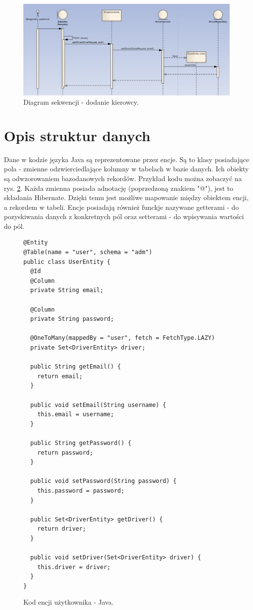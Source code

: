 \begin{figure}
	\centering
	\includegraphics[width=1\textwidth]{./graf/sequence_diagram.png}
	\caption{Diagram sekwencji - dodanie kierowcy.}
	\label{sequence_diagram}
\end{figure}

\section{Opis struktur danych}
\paragraph{}
Dane w kodzie języka Java są reprezentowane przez encje. Są to klasy posiadające pola - zmienne odzwierciedlające kolumny w tabelach w bazie danych. Ich obiekty są odwzorowaniem bazodanowych rekordów. Przykład kodu można zobaczyć na rys. \ref{fig:kod:encja}. Każda zmienna posiada adnotację (poprzedzoną znakiem "@"), jest to składania Hibernate. Dzięki temu jest możliwe mapowanie między obiektem encji, a rekordem w tabeli. Encje posiadają również funckje nazywane getterami - do pozyskiwania danych z konkretnych pól oraz setterami - do wpisywania wartości do pól.

\begin{figure}
\centering
\begin{lstlisting}
@Entity
@Table(name = "user", schema = "adm")
public class UserEntity {
  @Id
  @Column
  private String email;

  @Column
  private String password;

  @OneToMany(mappedBy = "user", fetch = FetchType.LAZY)
  private Set<DriverEntity> driver;

  public String getEmail() {
    return email;
  }

  public void setEmail(String username) {
    this.email = username;
  }

  public String getPassword() {
    return password;
  }

  public void setPassword(String password) {
    this.password = password;
  }

  public Set<DriverEntity> getDriver() {
    return driver;
  }

  public void setDriver(Set<DriverEntity> driver) {
    this.driver = driver;
  }
}
\end{lstlisting}
\caption{Kod encji użytkownika - Java.}
\label{fig:kod:encja}
\end{figure}

